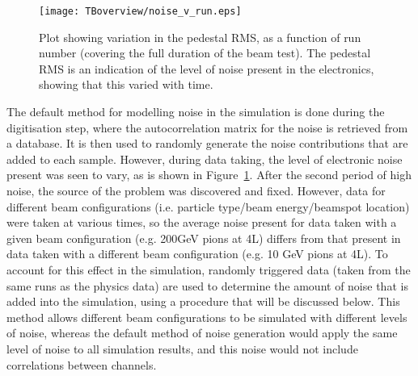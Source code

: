 \begin{figure}[tb]
\begin{center}
\texttt{[image: TBoverview/noise\_v\_run.eps]}
\end{center}
\caption[Plot showing pedestal RMS vs. run number]{Plot showing variation in the pedestal RMS, as a function of run number (covering the full duration of the beam test). The pedestal RMS is an indication of the level of noise present in the electronics, showing that this varied with time.}
\label{pedestal_variation}
\end{figure}

The default method for modelling noise in the simulation is done during the digitisation step, where the autocorrelation matrix for the noise is retrieved from a database. It is then used to randomly generate the noise contributions that are added to each sample. However, during data taking, the level of electronic noise present was seen to vary, as is shown in Figure~\ref{pedestal_variation}. After the second period of high noise, the source of the problem was discovered and fixed. However, data for different beam configurations (i.e. particle type/beam energy/beamspot location) were taken at various times, so the average noise present for data taken with a given beam configuration (e.g. 200GeV pions at 4L) differs from that present in data taken with a different beam configuration (e.g. 10 GeV pions at 4L). To account for this effect in the simulation, randomly triggered data (taken from the same runs as the physics data) are used to determine the amount of noise that is added into the simulation, using a procedure that will be discussed below. This method allows different beam configurations to be simulated with different levels of noise, whereas the default method of noise generation would apply the same level of noise to all simulation results, and this noise would not include correlations between channels.


